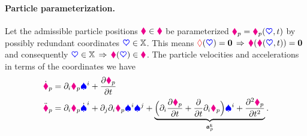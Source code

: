 \paragraph{Particle parameterization.}
Let the admissible particle positions $\boldsymbol{\textcolor{magenta}{\blacklozenge}} \in \textcolor{magenta}{\blacklozenge}$ be parameterized $\boldsymbol{\textcolor{magenta}{\blacklozenge}}_{p} = \boldsymbol{\textcolor{magenta}{\blacklozenge}}_{p}(\boldsymbol{\textcolor{blue}{\heartsuit}}, t)$ by possibly redundant coordinates $\boldsymbol{\textcolor{blue}{\heartsuit}} \in \mathbb{X}$.
This means $\boldsymbol{\textcolor{red}{\Diamond}}(\boldsymbol{\textcolor{blue}{\heartsuit}}) = \boldsymbol{0}\,\Rightarrow\,\boldsymbol{\textcolor{magenta}{\blacklozenge}}(\boldsymbol{\textcolor{magenta}{\blacklozenge}}(\boldsymbol{\textcolor{blue}{\heartsuit}},t)) = \boldsymbol{0}$ and consequently $\boldsymbol{\textcolor{blue}{\heartsuit}} \in \mathbb{X} \, \Rightarrow \, \boldsymbol{\textcolor{magenta}{\blacklozenge}}(\boldsymbol{\textcolor{blue}{\heartsuit}}) \in \textcolor{magenta}{\blacklozenge}$.
The particle velocities and accelerations in terms of the coordinates we have 
\begin{subequations}\label{eq:particleVelAcc}
\begin{align}
 \particlePosd{\PidxI} &= \dirDiff{\LidxI}\particlePos{\PidxI} \sysVelCoeff{\LidxI} + \pdiff[\particlePos{\PidxI}]{t}
\\
 \particlePosdd{\PidxI} &= \dirDiff{\LidxI}\particlePos{\PidxI} \sysVelCoeffd{\LidxI} + \dirDiff{\LidxII}\dirDiff{\LidxI}\particlePos{\PidxI} \sysVelCoeff{\LidxI} \sysVelCoeff{\LidxII}
  + \underbrace{\Big( \dirDiff{\LidxI} \pdiff[\particlePos{\PidxI}]{t} + \pdiff{t}\dirDiff{i}\particlePos{\PidxI} \Big) \sysVelCoeff{\LidxI} + \frac{\partial^2 \particlePos{\PidxI}}{\partial t^2}}_{\particleAccTime{\PidxI}}.
\label{eq:particleAcc}
\end{align}
\end{subequations}

